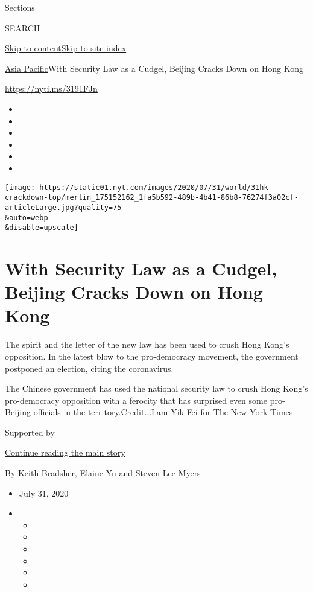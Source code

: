 Sections

SEARCH

\protect\hyperlink{site-content}{Skip to
content}\protect\hyperlink{site-index}{Skip to site index}

\href{/section/world/asia}{Asia Pacific}\textbar{}With Security Law as a
Cudgel, Beijing Cracks Down on Hong Kong

\url{https://nyti.ms/3191FJn}

\begin{itemize}
\item
\item
\item
\item
\item
\item
\end{itemize}

\texttt{[image: https://static01.nyt.com/images/2020/07/31/world/31hk-crackdown-top/merlin\_175152162\_1fa5b592-489b-4b41-86b8-76274f3a02cf-articleLarge.jpg?quality=75\\\&auto=webp\\\&disable=upscale]}

\hypertarget{with-security-law-as-a-cudgel-beijing-cracks-down-on-hong-kong}{%
\section{With Security Law as a Cudgel, Beijing Cracks Down on Hong
Kong}\label{with-security-law-as-a-cudgel-beijing-cracks-down-on-hong-kong}}

The spirit and the letter of the new law has been used to crush Hong
Kong's opposition. In the latest blow to the pro-democracy movement, the
government postponed an election, citing the coronavirus.

The Chinese government has used the national security law to crush Hong
Kong's pro-democracy opposition with a ferocity that has surprised even
some pro-Beijing officials in the territory.Credit...Lam Yik Fei for The
New York Times

Supported by

\protect\hyperlink{after-sponsor}{Continue reading the main story}

By \href{https://www.nytimes.com/by/keith-bradsher}{Keith Bradsher},
Elaine Yu and \href{https://www.nytimes.com/by/steven-lee-myers}{Steven
Lee Myers}

\begin{itemize}
\item
  July 31, 2020
\item
  \begin{itemize}
  \item
  \item
  \item
  \item
  \item
  \item
  \end{itemize}
\end{itemize}

